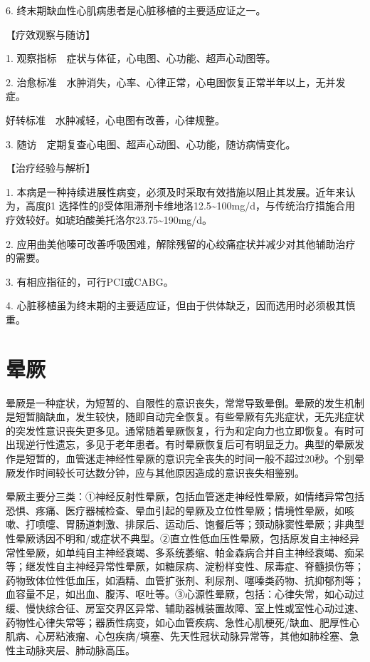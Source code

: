 6. 终末期缺血性心肌病患者是心脏移植的主要适应证之一。

【疗效观察与随访】

1. 观察指标　症状与体征，心电图、心功能、超声心动图等。

2.
治愈标准　水肿消失，心率、心律正常，心电图恢复正常半年以上，无并发症。

好转标准　水肿减轻，心电图有改善，心律规整。

3. 随访　定期复查心电图、超声心动图、心功能，随访病情变化。

【治疗经验与解析】

1.
本病是一种持续进展性病变，必须及时采取有效措施以阻止其发展。近年来认为，高度β{1}
选择性的β受体阻滞剂卡维地洛12.5\textasciitilde{}100mg/d，与传统治疗措施合用疗效较好。如琥珀酸美托洛尔23.75\textasciitilde{}190mg/d。

2.
应用曲美他嗪可改善呼吸困难，解除残留的心绞痛症状并减少对其他辅助治疗的需要。

3. 有相应指征的，可行PCI或CABG。

4.
心脏移植虽为终末期的主要适应证，但由于供体缺乏，因而选用时必须极其慎重。


\section{晕厥}

晕厥是一种症状，为短暂的、自限性的意识丧失，常常导致晕倒。晕厥的发生机制是短暂脑缺血，发生较快，随即自动完全恢复。有些晕厥有先兆症状，无先兆症状的突发性意识丧失更多见。通常随着晕厥恢复，行为和定向力也立即恢复。有时可出现逆行性遗忘，多见于老年患者。有时晕厥恢复后可有明显乏力。典型的晕厥发作是短暂的，血管迷走神经性晕厥的意识完全丧失的时间一般不超过20秒。个别晕厥发作时间较长可达数分钟，应与其他原因造成的意识丧失相鉴别。

晕厥主要分三类：①神经反射性晕厥，包括血管迷走神经性晕厥，如情绪异常包括恐惧、疼痛、医疗器械检查、晕血引起的晕厥及立位性晕厥；情境性晕厥，如咳嗽、打喷嚏、胃肠道刺激、排尿后、运动后、饱餐后等；颈动脉窦性晕厥；非典型性晕厥诱因不明和/或症状不典型。②直立性低血压性晕厥，包括原发自主神经异常性晕厥，如单纯自主神经衰竭、多系统萎缩、帕金森病合并自主神经衰竭、痴呆等；继发性自主神经异常性晕厥，如糖尿病、淀粉样变性、尿毒症、脊髓损伤等；药物致体位性低血压，如酒精、血管扩张剂、利尿剂、噻嗪类药物、抗抑郁剂等；血容量不足，如出血、腹泻、呕吐等。③心源性晕厥，包括：心律失常，如心动过缓、慢快综合征、房室交界区异常、辅助器械装置故障、室上性或室性心动过速、药物性心律失常等；器质性病变，如心血管疾病、急性心肌梗死/缺血、肥厚性心肌病、心房粘液瘤、心包疾病/填塞、先天性冠状动脉异常等，其他如肺栓塞、急性主动脉夹层、肺动脉高压。

